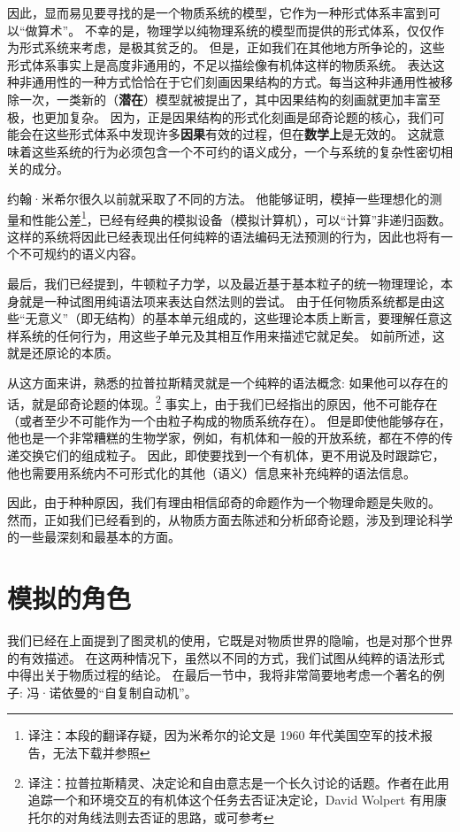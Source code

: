 \documentclass[a4paper,12pt]{article}
\begin{document}
因此，显而易见要寻找的是一个物质系统的模型，它作为一种形式体系丰富到可以“做算术”。
不幸的是，物理学以纯物理系统的模型而提供的形式体系，仅仅作为形式系统来考虑，是极其贫乏的。
但是，正如我们在其他地方所争论的，这些形式体系事实上是高度非通用的，不足以描绘像有机体这样的物质系统\cite{RosenRinpress}。
表达这种非通用性的一种方式恰恰在于它们刻画因果结构的方式。每当这种非通用性被移除一次，一类新的（\textbf{潜在}）模型就被提出了，其中因果结构的刻画就更加丰富至极，也更加复杂。
因为，正是因果结构的形式化刻画是邱奇论题的核心，我们可能会在这些形式体系中发现许多\textbf{因果}有效的过程，但在\textbf{数学上}是无效的。
这就意味着这些系统的行为必须包含一个不可约的语义成分，一个与系统的复杂性密切相关的成分。

约翰·米希尔很久以前就采取了不同的方法\cite{MyhillJ1966}。
他能够证明，模掉一些理想化的测量和性能公差\footnote[1]{译注：本段的翻译存疑，因为米希尔的论文是 1960 年代美国空军的技术报告，无法下载并参照}，已经有经典的\gls{模拟设备}（\gls{模拟计算机}），可以“计算”非递归函数。
这样的系统将因此已经表现出任何纯粹的语法编码无法预测的行为，因此也将有一个不可规约的语义内容。

最后，我们已经提到，牛顿粒子力学，以及最近基于基本粒子的统一物理理论，本身就是一种试图用纯语法项来表达自然法则的尝试。
由于任何物质系统都是由这些“无意义”（即无结构）的基本单元组成的，这些理论本质上断言，要理解任意这样系统的任何行为，用这些子单元及其相互作用来描述它就足矣。
如前所述，这就是还原论的本质。

从这方面来讲，熟悉的拉普拉斯精灵就是一个纯粹的语法概念: 如果他可以存在的话，就是邱奇论题的体现。\footnote[2]{译注：拉普拉斯精灵、决定论和自由意志是一个长久讨论的话题。作者在此用追踪一个和环境交互的有机体这个任务去否证决定论，David Wolpert 有用康托尔的对角线法则去否证的思路，或可参考}
事实上，由于我们已经指出的原因，他不可能存在（或者至少不可能作为一个由粒子构成的物质系统存在）。
但是即使他能够存在，他也是一个非常糟糕的生物学家，例如，有机体和一般的开放系统，都在不停的传递交换它们的组成粒子。
因此，即使要找到一个有机体，更不用说及时跟踪它，他也需要用系统内不可形式化的其他（语义）信息来补充纯粹的语法信息。

因此，由于种种原因，我们有理由相信邱奇的命题作为一个物理命题是失败的。
然而，正如我们已经看到的，从物质方面去陈述和分析邱奇论题，涉及到理论科学的一些最深刻和最基本的方面。

\section{模拟的角色}

我们已经在上面提到了图灵机的使用，它既是对物质世界的隐喻，也是对那个世界的有效描述。
在这两种情况下，虽然以不同的方式，我们试图从纯粹的语法形式中得出关于物质过程的结论。
在最后一节中，我将非常简要地考虑一个著名的例子: 冯·诺依曼的“自复制自动机”\cite{BurksA1966}\cite{ArbibMA1988}。
\end{document}
